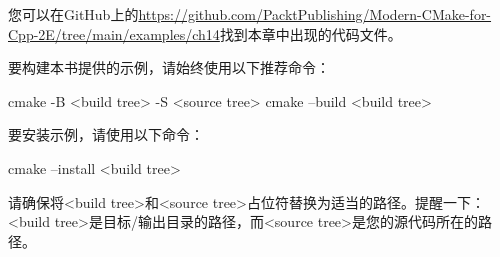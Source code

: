 您可以在GitHub上的\url{https://github.com/PacktPublishing/Modern-CMake-for-Cpp-2E/tree/main/examples/ch14}找到本章中出现的代码文件。

要构建本书提供的示例，请始终使用以下推荐命令：

\begin{shell}
cmake -B <build tree> -S <source tree>
cmake --build <build tree>
\end{shell}

要安装示例，请使用以下命令：

\begin{shell}
cmake --install <build tree>
\end{shell}

请确保将<build tree>和<source tree>占位符替换为适当的路径。提醒一下：<build tree>是目标/输出目录的路径，而<source tree>是您的源代码所在的路径。





